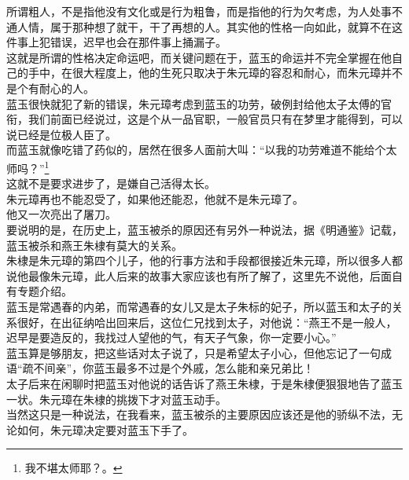 \begin{multicols}{\theparacolNo}
所谓粗人，不是指他没有文化或是行为粗鲁，而是指他的行为欠考虑，为人处事不通人情，属于那种想了就干，干了再想的人。其实他的性格一向如此，就算不在这件事上犯错误，迟早也会在那件事上捅漏子。\\

这就是所谓的性格决定命运吧，而关键问题在于，蓝玉的命运并不完全掌握在他自己的手中，在很大程度上，他的生死只取决于朱元璋的容忍和耐心，而朱元璋并不是个有耐心的人。\\

蓝玉很快就犯了新的错误，朱元璋考虑到蓝玉的功劳，破例封给他太子太傅的官衔，我们前面已经说过，这是个从一品官职，一般官员只有在梦里才能得到，可以说已经是位极人臣了。\\

而蓝玉就像吃错了药似的，居然在很多人面前大叫：“以我的功劳难道不能给个太师吗？”\footnote{我不堪太师耶？。}\\

这就不是要求进步了，是嫌自己活得太长。\\

朱元璋再也不能忍受了，如果他还能忍，他就不是朱元璋了。\\

他又一次亮出了屠刀。\\

要说明的是，在历史上，蓝玉被杀的原因还有另外一种说法，据《明通鉴》记载，蓝玉被杀和燕王朱棣有莫大的关系。\\

朱棣是朱元璋的第四个儿子，他的行事方法和手段都很接近朱元璋，所以很多人都说他最像朱元璋，此人后来的故事大家应该也有所了解了，这里先不说他，后面自有专题介绍。\\

蓝玉是常遇春的内弟，而常遇春的女儿又是太子朱标的妃子，所以蓝玉和太子的关系很好，在出征纳哈出回来后，这位仁兄找到太子，对他说：“燕王不是一般人，迟早是要造反的，我找过人望他的气，有天子气象，你一定要小心。”\\

蓝玉算是够朋友，把这些话对太子说了，只是希望太子小心，但他忘记了一句成语“疏不间亲”，你蓝玉最多不过是个外戚，怎么能和亲兄弟比！\\

太子后来在闲聊时把蓝玉对他说的话告诉了燕王朱棣，于是朱棣便狠狠地告了蓝玉一状。朱元璋在朱棣的挑拨下才对蓝玉动手。\\

当然这只是一种说法，在我看来，蓝玉被杀的主要原因应该还是他的骄纵不法，无论如何，朱元璋决定要对蓝玉下手了。\\


\end{multicols}
